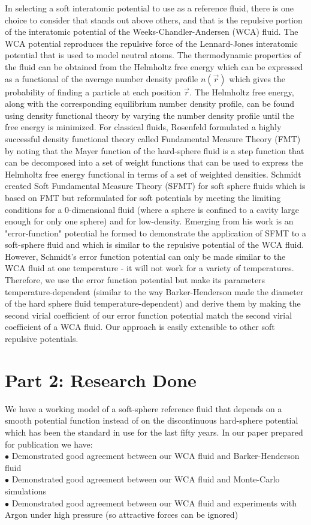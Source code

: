\documentclass[double,12pt]{revtex4-2}
\begin{document}
In selecting a soft interatomic potential to use as a reference fluid, 
there is one choice to consider that stands out above others, and that is 
the repulsive portion of the interatomic potential of the 
Weeks-Chandler-Andersen (WCA) fluid.
The WCA potential reproduces the repulsive force of the Lennard-Jones 
interatomic potential that is used to model neutral atoms. 
The thermodynamic properties of the fluid can be obtained from the 
Helmholtz free energy which
can be expressed as a functional of the average number 
density profile $n(\vec r)$ 
which gives the probability of finding a particle at each position $\vec r$. 
The Helmholtz free energy, along with the corresponding equilibrium number density profile,
can be found using density functional theory by 
varying the number density profile until the free energy is minimized.
For classical fluids, Rosenfeld formulated a highly successful 
density functional theory called Fundamental Measure Theory (FMT)
by noting that the Mayer function of the hard-sphere fluid is a step function
that can be decomposed into a set of weight functions that can be used 
to express the Helmholtz free energy functional in terms of a set of weighted densities. 
Schmidt created Soft Fundamental Measure Theory (SFMT) for soft sphere 
fluids which is based on FMT but reformulated for soft potentials by 
meeting the limiting conditions for a 0-dimensional fluid (where a sphere 
is confined to a cavity large enough for only one sphere) 
and for low-density. 
Emerging from his work is an "error-function" potential he formed to 
demonstrate the application of SFMT to a soft-sphere fluid and which is
similar to the repulsive potential of the WCA fluid. However, 
Schmidt's error function potential can only be made similar to the WCA fluid 
at one temperature -
it will not work for a variety of temperatures. 
Therefore, we use the error function potential but make
its parameters temperature-dependent (similar to the way Barker-Henderson made the
diameter of the hard sphere fluid temperature-dependent) and derive them by 
making the second virial coefficient of our error function potential match the second virial 
coefficient of a WCA fluid. Our approach is easily extensible to other soft
repulsive potentials.

\section{Part 2: Research Done}
We have a working model of a soft-sphere reference fluid that depends 
on a smooth potential function instead of on the discontinuous hard-sphere potential 
which has been the standard in use for the last fifty years. 
In our paper prepared for publication we have: \\
$\bullet$ Demonstrated good agreement between our WCA fluid and Barker-Henderson fluid \\
$\bullet$ Demonstrated good agreement between our WCA fluid and Monte-Carlo simulations \\
$\bullet$ Demonstrated good agreement between our WCA fluid and experiments with Argon under high pressure (so attractive forces can be ignored) \\
\end{document}
